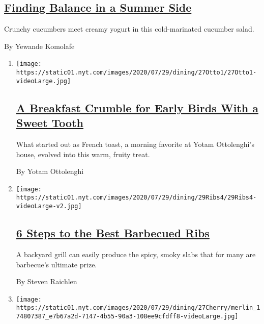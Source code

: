 \begin{enumerate}
  \hypertarget{finding-balance-in-a-summer-side}{%
  \subsection{\texorpdfstring{\href{/2020/07/27/dining/cucumbers-yogurt-recipe.html}{Finding
  Balance in a Summer
  Side}}{Finding Balance in a Summer Side}}\label{finding-balance-in-a-summer-side}}

  Crunchy cucumbers meet creamy yogurt in this cold-marinated cucumber
  salad.

  By Yewande Komolafe
\end{enumerate}

\begin{enumerate}
\def\labelenumi{\arabic{enumi}.}
\item
  \texttt{[image: https://static01.nyt.com/images/2020/07/29/dining/27Otto1/27Otto1-videoLarge.jpg]}

  \hypertarget{a-breakfast-crumble-for-early-birds-with-a-sweet-tooth}{%
  \subsection{\texorpdfstring{\href{/2020/07/27/dining/breakfast-crumble-recipe.html}{A
  Breakfast Crumble for Early Birds With a Sweet
  Tooth}}{A Breakfast Crumble for Early Birds With a Sweet Tooth}}\label{a-breakfast-crumble-for-early-birds-with-a-sweet-tooth}}

  What started out as French toast, a morning favorite at Yotam
  Ottolenghi's house, evolved into this warm, fruity treat.

  By Yotam Ottolenghi
\item
  \texttt{[image: https://static01.nyt.com/images/2020/07/29/dining/29Ribs4/29Ribs4-videoLarge-v2.jpg]}

  \hypertarget{6-steps-to-the-best-barbecued-ribs}{%
  \subsection{\texorpdfstring{\href{/2020/07/24/dining/bbq-ribs-recipe.html}{6
  Steps to the Best Barbecued
  Ribs}}{6 Steps to the Best Barbecued Ribs}}\label{6-steps-to-the-best-barbecued-ribs}}

  A backyard grill can easily produce the spicy, smoky slabs that for
  many are barbecue's ultimate prize.

  By Steven Raichlen
\item
  \texttt{[image: https://static01.nyt.com/images/2020/07/29/dining/27Cherry/merlin\_174807387\_e7b67a2d-7147-4b55-90a3-108ee9cfdff8-videoLarge.jpg]}


\end{enumerate}
